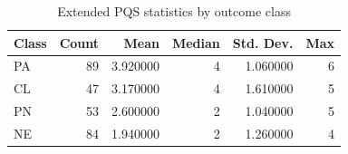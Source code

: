 \begin{table}
\caption{Extended PQS statistics by outcome class}
\label{tab:extended-pqs-by-outcome}
\begin{tabular}{lrrrrr}
\toprule
Class & Count & Mean & Median & Std. Dev. & Max \\
\midrule
PA & 89 & 3.920000 & 4 & 1.060000 & 6 \\
CL & 47 & 3.170000 & 4 & 1.610000 & 5 \\
PN & 53 & 2.600000 & 2 & 1.040000 & 5 \\
NE & 84 & 1.940000 & 2 & 1.260000 & 4 \\
\bottomrule
\end{tabular}
\end{table}
